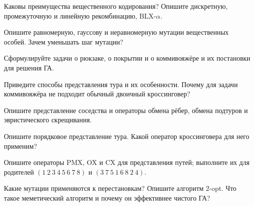 \begin{questions}
\item Каковы преимущества вещественного кодирования? Опишите дискретную, промежуточную и линейную
рекомбинацию, BLX-$\alpha$.
\item Опишите равномерную, гауссову и неравномерную мутации вещественных особей. Зачем уменьшать шаг
мутации?
\item Сформулируйте задачи о рюкзаке, о покрытии и о коммивояжёре и их постановки для решения ГА.
\item Приведите способы представления тура и их особенности. Почему для задачи коммивояжёра не подходит
обычный двоичный кроссинговер?
\item Опишите представление соседства и операторы обмена рёбер, обмена подтуров и эвристического
скрещивания.
\item Опишите порядковое представление тура. Какой оператор кроссинговера для него применим?
\item Опишите операторы PMX, OX и CX для представления путей; выполните их для родителей
$(1\ 2\ 3\ 4\ 5\ 6\ 7\ 8)$ и $(3\ 7\ 5\ 1\ 6\ 8\ 2\ 4)$.
\item Какие мутации применяются к перестановкам? Опишите алгоритм 2-opt. Что такое меметический алгоритм и почему он эффективнее чистого ГА?
\end{questions}
